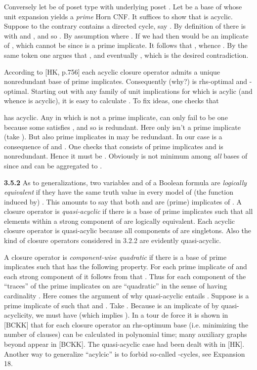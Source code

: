 \documentclass[11pt]{article}
\begin{document}
Conversely let  be of poset type with underlying poset . Let  be a base of  whose unit expansion yields a {\it prime} Horn CNF. It suffices to show that  is acyclic. Suppose to the contrary  contains a directed cycle, say . By definition of  there is  with  and , and so . By assumption  where . If we had  then  would be an implicate of , which cannot be since  is a prime implicate. It follows that , whence . By the same token one argues that , and eventually , which is the desired contradiction. 
\hfill
\hfill 

According to [HK, p.756] each acyclic closure operator  admits a unique nonredundant base  of prime implicates. Consequently (why?)  is rhs-optimal and -optimal. Starting out with any family  of unit implications for which  is acylic (and whence  is acyclic), it is easy to calculate .
To fix ideas, one checks that

has  acyclic. Any  in  which is not a prime implicate, can only fail to be one because some  satisfies , and so  is redundant. Here only  isn't a prime implicate (take ). But also prime implicates in  may be redundant. In our case  is a consequence of  and . One checks that  consists of prime implicates and is nonredundant. Hence it must be . Obviously  is not minimum among {\it all} bases of  since  and  can be aggregated to .

{\bf 3.5.2} As to generalizations, two variables  and  of a Boolean formula  are {\it logically equivalent} if they have the same truth value in every model of (the function induced by) . This amounts to say that both  and  are (prime) implicates of . A closure operator  is {\it quasi-acyclic} if there is a base  of prime implicates such that all elements within a strong component of  are logically equivalent. Each acyclic closure operator is quasi-acylic because all components of  are singletons. Also the kind of closure operators  considered in 3.2.2 are evidently quasi-acyclic.


A closure operator  is {\it component-wise quadratic}  if there is a base  of prime implicates such that  has the following property. For each prime implicate  of  and each strong component  of  it follows from  that . Thus for each component  of  the ``traces'' of the prime implicates on  are ``quadratic'' in the sense of having cardinality . Here comes the argument of why quasi-acyclic entails . Suppose  is a prime implicate of  such that  and . Take . Because  is an implicate of  by quasi-acyclicity, we must have  (which implies ).  In a tour de force it is shown in [BCKK] that for each  closure operator an rhs-optimum base (i.e. minimizing the number of clauses) can be calculated in polynomial time; many auxiliary graphs beyond  appear in [BCKK]. The quasi-acyclic case had been dealt with in [HK]. Another way to generalize ``acylcic'' is to forbid so-called -cycles, see Expansion 18.
\end{document}

